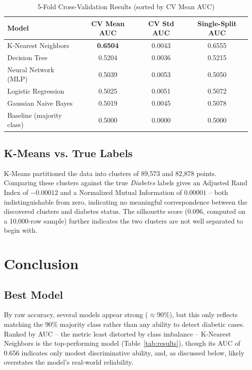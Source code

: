 \documentclass[journal]{IEEEtran}
\begin{document}
\begin{table}[!ht]
\centering
\caption{5-Fold Cross-Validation Results (sorted by CV Mean AUC)}
\label{tab:cv}
\begin{tabular}{@{}lccc@{}}
\toprule
\textbf{Model} & \textbf{CV Mean AUC} & \textbf{CV Std AUC} & \textbf{Single-Split AUC} \\
\midrule
K-Nearest Neighbors        & \textbf{0.6504} & 0.0043 & 0.6555 \\
Decision Tree               & 0.5204 & 0.0036 & 0.5215 \\
Neural Network (MLP)        & 0.5039 & 0.0053 & 0.5050 \\
Logistic Regression         & 0.5025 & 0.0051 & 0.5072 \\
Gaussian Naive Bayes        & 0.5019 & 0.0045 & 0.5078 \\
Baseline (majority class)   & 0.5000 & 0.0000 & 0.5000 \\
\bottomrule
\end{tabular}
\end{table}

\subsection{K-Means vs. True Labels}
K-Means partitioned the data into clusters of 89{,}573 and 82{,}878 points. Comparing these clusters against the true \textit{Diabetes} labels gives an Adjusted Rand Index of $-0.00012$ and a Normalized Mutual Information of $0.00001$ -- both indistinguishable from zero, indicating no meaningful correspondence between the discovered clusters and diabetes status. The silhouette score (0.096, computed on a 10{,}000-row sample) further indicates the two clusters are not well separated to begin with.

\section{Conclusion}

\subsection{Best Model}
By raw accuracy, several models appear strong ($\approx$90\%), but this only reflects matching the 90\% majority class rather than any ability to detect diabetic cases. Ranked by AUC -- the metric least distorted by class imbalance -- K-Nearest Neighbors is the top-performing model (Table~\ref{tab:results}), though its AUC of 0.656 indicates only modest discriminative ability, and, as discussed below, likely overstates the model's real-world reliability.
\end{document}
